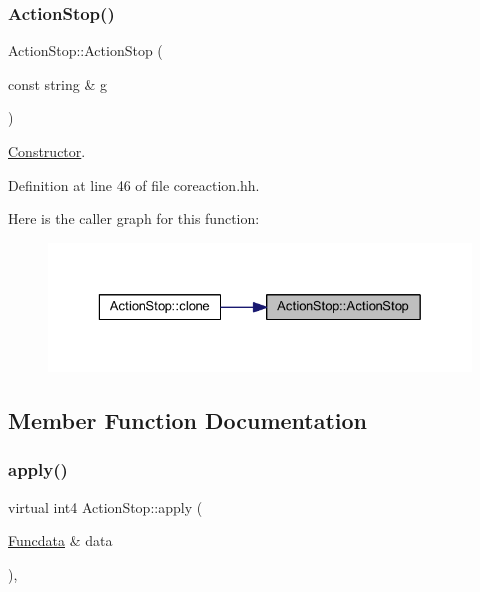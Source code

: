 \subsubsection{\texorpdfstring{ActionStop()}{ActionStop()}}
{\footnotesize\ttfamily Action\+Stop\+::\+Action\+Stop (\begin{DoxyParamCaption}\item[{const string \&}]{g }\end{DoxyParamCaption})\hspace{0.3cm}{\ttfamily [inline]}}



\mbox{\hyperlink{class_constructor}{Constructor}}. 



Definition at line 46 of file coreaction.\+hh.

Here is the caller graph for this function\+:
\nopagebreak
\begin{figure}[H]
\begin{center}
\leavevmode
\includegraphics[width=329pt]{class_action_stop_abab34d77c374f0900c2ec274e569a3a9_icgraph}
\end{center}
\end{figure}


\subsection{Member Function Documentation}
\mbox{\label{class_action_stop_a2d539e33984e982dad5cc306141c9787}} 
\subsubsection{\texorpdfstring{apply()}{apply()}}
{\footnotesize\ttfamily virtual int4 Action\+Stop\+::apply (\begin{DoxyParamCaption}\item[{\mbox{\hyperlink{class_funcdata}{Funcdata}} \&}]{data }\end{DoxyParamCaption})\hspace{0.3cm}{\ttfamily [inline]}, {\ttfamily [virtual]}}



